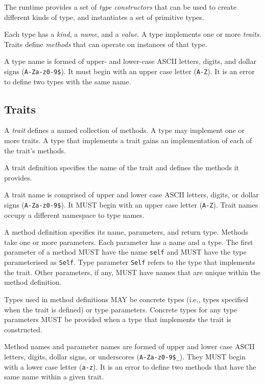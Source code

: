 \documentclass[10pt,twocolumn,a4paper]{article}
\newcommand{\code}[1]{\texttt{#1}}
\begin{document}
The runtime provides a set of \emph{type constructors} that can be used to
create different kinds of type, and instantiates a set of primitive types.

Each type has a \emph{kind}, a \emph{name}, and a \emph{value}.
A type implements one or more \emph{traits}.
Traits define \emph{methods} that can operate on instances of that type.

A type name is formed of upper- and lower-case ASCII letters, digits, and
dollar signs (\code{A-Za-z0-9\$}). It must begin with an upper case letter
(\code{A-Z}). It is an error to define two types with the same name.

\subsection{Traits}
\label{sec:traits}

A \emph{trait} defines a named collection of methods. A type may implement
one or more traits. A type that implements a trait gains an implementation
of each of the trait's methods.

A trait definition specifies the name of the trait and defines the methods
it provides.

A trait name is comprised of upper and lower case ASCII letters, digits, or
dollar signs (\code{A-Za-z0-9\$}).  It MUST begin with an upper case letter
(\code{A-Z}). Trait names occupy a different namespace to type names.

A method definition specifies its name, parameters, and return type. Methods
take one or more parameters. Each parameter has a name and a type. The first
parameter of a method MUST have the name \code{self} and MUST have the type
parameterised as \code{Self}. Type parameter \code{Self} refers to the type
that implements the trait. Other parameters, if any, MUST have names that are
unique within the method definition.

Types used in method definitions MAY be concrete types (i.e., types
specified when the trait is defined) or type parameters. Concrete types for
any type parameters MUST be provided when a type that implements the trait
is constructed.

Method names and parameter names are formed of upper and lower case ASCII
letters, digits, dollar signs, or underscores (\code{A-Za-z0-9\$\_}). They
MUST begin with a lower case letter (\code{a-z}).
It is an error to define two methods that have the same name within a given
trait.
\end{document}
